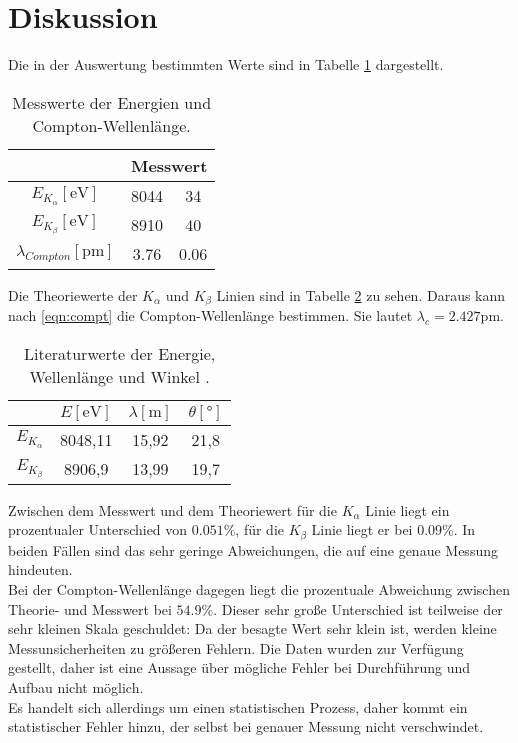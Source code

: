 \section{Diskussion}
\label{sec:Diskussion}

Die in der Auswertung bestimmten Werte sind in Tabelle \ref{tab:mess}
dargestellt. 

\begin{table}
    \centering
    \begin{tabular}{c c @{${}\pm{}$} c}
        \toprule
        & \multicolumn{2}{c}{Messwert} \\
        \midrule
        $E_{K_\alpha} [\text{eV}]$ & 8044 & 34 \\
        $E_{K_\beta} [\text{eV}]$ & 8910 & 40 \\
        $\lambda_{Compton} [\text{pm}]$ & 3.76 & 0.06\\ 
        \bottomrule
    \end{tabular}
    \caption{Messwerte der Energien und Compton-Wellenlänge.}
    \label{tab:mess}
\end{table}
\noindent Die Theoriewerte der $K_\alpha$ und $K_\beta$ Linien sind in Tabelle
\ref{tab:theo} zu sehen. Daraus kann nach \eqref{eqn:compt}
die Compton-Wellenlänge bestimmen. Sie lautet $\lambda_c = 2.427 \si{\pico\m}$.

\begin{table}
    \centering
    \begin{tabular}{c c c c}
        \toprule
        & $E [\text{eV}]$ & $\lambda [\text{m}]$ & $\theta [°]$\\
        \midrule
        $E_{K_{\alpha}}$ & 8048,11 & 15,92 & 21,8\\
        $E_{K_{\beta}} $ & 8906,9 & 13,99 & 19,7\\
        \bottomrule
    \end{tabular}
    \caption{Literaturwerte der Energie, Wellenlänge und Winkel \cite{theo}.}
    \label{tab:theo}
\end{table}
\noindent Zwischen dem Messwert und dem Theoriewert für die $K_\alpha$ Linie liegt ein prozentualer
Unterschied von $0.051 \%$, für die $K_\beta$ Linie liegt er bei $0.09 \%$.
In beiden Fällen sind das sehr geringe Abweichungen, die auf eine genaue Messung
hindeuten. \\
Bei der Compton-Wellenlänge dagegen liegt die prozentuale Abweichung
zwischen Theorie- und Messwert bei $54.9 \%$. Dieser sehr große Unterschied
ist teilweise der sehr kleinen Skala geschuldet: Da der besagte Wert sehr klein ist,
werden kleine Messunsicherheiten zu größeren Fehlern. Die Daten wurden zur Verfügung 
gestellt, daher ist eine Aussage über mögliche Fehler bei Durchführung und Aufbau nicht
möglich.\\
Es handelt sich allerdings um einen statistischen Prozess, daher kommt ein statistischer Fehler 
hinzu, der selbst bei genauer Messung nicht verschwindet. 

